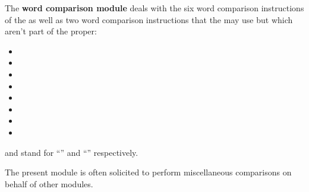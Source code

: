 The \textbf{word comparison module} deals with the six word comparison instructions of the \evm{} as well as two word comparison instructions that the \zkEvm{} may use but which aren't part of the \evm{} proper:
\begin{multicols}{4}
\begin{itemize}
    \item {}
    \item {}
    \item {}
    \item {}
    \item {}
    \item {}
    \item {}
    \item {}
\end{itemize}
\end{multicols}
\saNote{}
 and  stand for 
``'' and
``'' respectively.

The present module is often solicited to perform miscellaneous comparisons on behalf of other modules.
